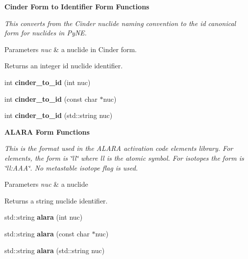 \begin{Indent}\textbf{ Cinder Form to Identifier Form Functions}\par
{\em This converts from the Cinder nuclide naming convention to the id canonical form for nuclides in Py\+NE. 
\begin{DoxyParams}{Parameters}
{\em nuc} & a nuclide in Cinder form. \\
\hline
\end{DoxyParams}
\begin{DoxyReturn}{Returns}
an integer id nuclide identifier. 
\end{DoxyReturn}
}\begin{DoxyCompactItemize}
\item 
\mbox{\label{namespacepyne_1_1nucname_a5c016b1b66515eb8050137ac45afdfd0}} 
int {\bfseries cinder\+\_\+to\+\_\+id} (int nuc)
\item 
\mbox{\label{namespacepyne_1_1nucname_a5b3cbddb3ab00d191b4a0c23603d34f1}} 
int {\bfseries cinder\+\_\+to\+\_\+id} (const char $\ast$nuc)
\item 
\mbox{\label{namespacepyne_1_1nucname_a72bc35fb19b1cfd3dc8a11d9a8963d4a}} 
int {\bfseries cinder\+\_\+to\+\_\+id} (std\+::string nuc)
\end{DoxyCompactItemize}
\end{Indent}
\begin{Indent}\textbf{ A\+L\+A\+RA Form Functions}\par
{\em This is the format used in the A\+L\+A\+RA activation code elements library. For elements, the form is \char`\"{}ll\char`\"{} where ll is the atomic symbol. For isotopes the form is \char`\"{}ll\+:\+A\+A\+A\char`\"{}. No metastable isotope flag is used. 
\begin{DoxyParams}{Parameters}
{\em nuc} & a nuclide \\
\hline
\end{DoxyParams}
\begin{DoxyReturn}{Returns}
a string nuclide identifier. 
\end{DoxyReturn}
}\begin{DoxyCompactItemize}
\item 
\mbox{\label{namespacepyne_1_1nucname_a6180f363d79c5865e19299a12bf6bc7f}} 
std\+::string {\bfseries alara} (int nuc)
\item 
\mbox{\label{namespacepyne_1_1nucname_a56aa0b99e1385696757b46bd19e9064e}} 
std\+::string {\bfseries alara} (const char $\ast$nuc)
\item 
\mbox{\label{namespacepyne_1_1nucname_a4317364d7f2fd4271d8d6d64a3844473}} 
std\+::string {\bfseries alara} (std\+::string nuc)
\end{DoxyCompactItemize}
\end{Indent}
